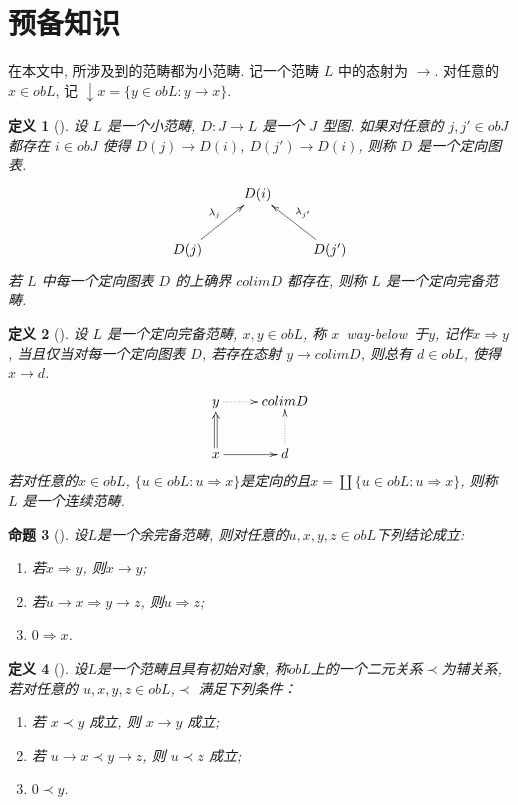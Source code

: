 \documentclass[c5size,a4paper,hyperref,fancyhdr,UTF8]{ctexart}
\theoremstyle{nonumberplain}
\newtheorem{definition}{定义}[section]
\newtheorem{proposition}[definition]{命题}
\theoremstyle{nonumberplain}
\newcommand{\upcite}[1]{\textsuperscript{\cite{#1}}}
\begin{document}
\section{预备知识}
\label{sec:introd}

在本文中, 所涉及到的范畴都为小范畴. 记一个范畴 $L$ 中的态射为 $\rightarrow$. 对任意的 $x\in obL$,
记 $\downarrow x=\{y\in obL:y\rightarrow x\}$.

\begin{definition}[\upcite{r4}]
设 $L$ 是一个小范畴, $D:J\rightarrow L$ 是一个 $J$ 型图. 如果对任意的 $j,j'\in obJ$ 都存在 $i\in obJ$ 使得 $D(j)\rightarrow D(i)$, $D(j')\rightarrow D(i)$, 则称 $D$ 是一个定向图表.
$$
\xymatrix{
    &D(i)& \\
    D(j)\ar[ur]^{\lambda_{j}}&&D(j')\ar[ul]_{\lambda_{j'}}
}
$$
若 $L$ 中每一个定向图表 $D$ 的上确界 $colim D$ 都存在, 则称 $L$ 是一个定向完备范畴.
\end{definition}

\begin{definition}[\upcite{r4}]
设 $L$ 是一个定向完备范畴, $x,y\in obL$, 称 $x$~way-below~于$y$, 记作$x\Rightarrow y$, 当且仅当对每一个定向图表 $D$, 若存在态射 $y\rightarrow colim D$, 则总有 $d\in obL$, 使得 $x\rightarrow d$.
$$
\xymatrix{
    y\ar@{.>}[r] & colim D\\
    x\ar@{=>}[u]\ar[r] & d\ar@{.>}[u]}
$$
若对任意的$x\in obL$, $\{u\in obL:u\Rightarrow x\}$是定向的且$x=\coprod\{u\in obL:u\Rightarrow x\}$, 则称 $L$ 是一个连续范畴.
\end{definition}

\begin{proposition}[\upcite{r4}]\label{propos:1}
设$L$是一个余完备范畴, 则对任意的$u,x,y,z\in obL$下列结论成立:
\begin{enumerate}
\item 若$x\Rightarrow y$, 则$x\rightarrow y$;
\item 若$u\rightarrow x\Rightarrow y\rightarrow z$, 则$u\Rightarrow z$;
\item $0\Rightarrow x$.
\end{enumerate}
\end{proposition}

\begin{definition}[\upcite{r4}]
设$L$是一个范畴且具有初始对象, 称$obL$上的一个二元关系$\prec$为辅关系, 若对任意的 $u,x,y,z\in obL$,$\prec$ 满足下列条件：
\begin{enumerate}
\item 若 $x\prec y$ 成立, 则 $x\rightarrow y$ 成立;
\item 若 $u\rightarrow x\prec y\rightarrow z$, 则 $u\prec z$ 成立;
\item $0\prec y$.
\end{enumerate}
\end{definition}
\end{document}
